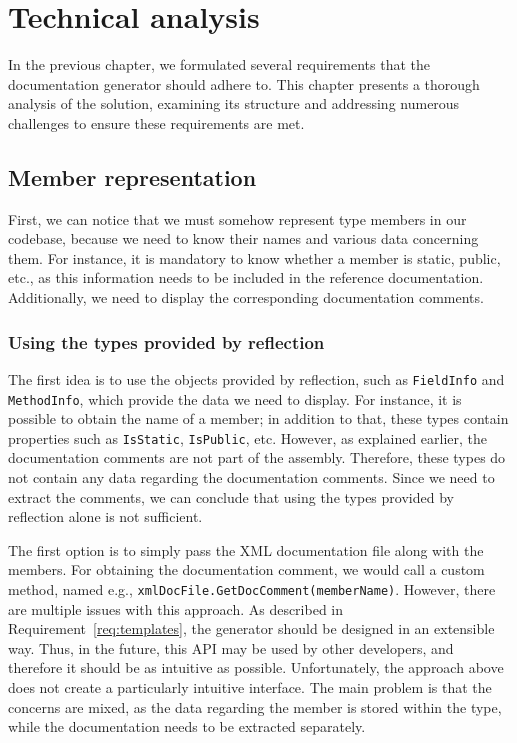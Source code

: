 \chapter{Technical analysis}

In the previous chapter, we formulated several requirements that the documentation generator should adhere to.
This chapter presents a thorough analysis of the solution, examining its structure and addressing numerous challenges to ensure these requirements are met.

\section{Member representation}
\label{sec:member-repr}

First, we can notice that we must somehow represent type members in our codebase, because we need to know their names and various data concerning them. 
For instance, it is mandatory to know whether a member is static, public, etc., as this information needs to be included in the reference documentation.
Additionally, we need to display the corresponding documentation comments.

\subsection*{Using the types provided by reflection}
The first idea is to use the objects provided by reflection, such as \texttt{FieldInfo} and \texttt{MethodInfo}, which provide the data we need to display.
For instance, it is possible to obtain the name of a member; in addition to that, 
these types contain properties such as \texttt{IsStatic}, \texttt{IsPublic}, etc.
However, as explained earlier, the documentation comments are not part of the assembly. 
Therefore, these types do not contain any data regarding the documentation comments.
Since we need to extract the comments, we can conclude that using the types provided by reflection alone is not sufficient.

The first option is to simply pass the XML documentation file along with the members.
For obtaining the documentation comment, we would call a custom method, named e.g., \texttt{xmlDocFile.GetDocComment(memberName)}.
However, there are multiple issues with this approach.
As described in Requirement~\ref{req:templates}, the generator should be designed in an extensible way.
Thus, in the future, this API may be used by other developers, and therefore it should be as intuitive as possible.
Unfortunately, the approach above does not create a particularly intuitive interface. 
The main problem is that the concerns are mixed, as the data regarding the member is stored within the type, while the documentation needs to be extracted separately.

